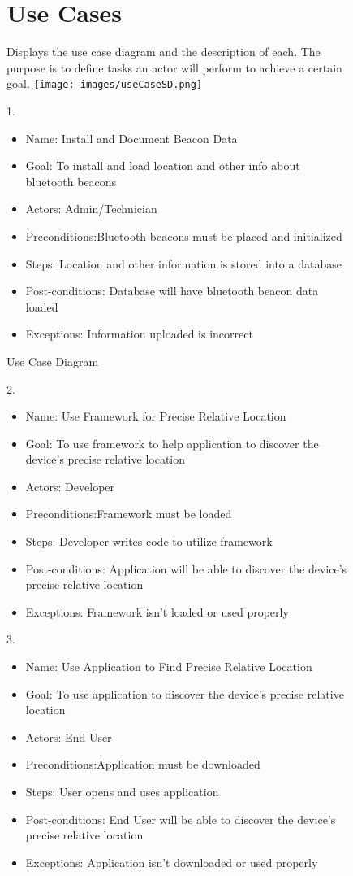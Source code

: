 \begin{figure}
\chapter{Use Cases}
Displays the use case diagram and the description of each. The purpose is to define tasks an actor will perform to achieve a certain goal.
\newline
\texttt{[image: images/useCaseSD.png]}
\caption{Use Case Diagram}

1.
\begin{itemize}
\item Name: Install and Document Beacon Data
\item Goal: To install and load location and other info about bluetooth beacons
\item Actors: Admin/Technician
\item Preconditions:Bluetooth beacons must be placed and initialized
\item Steps: Location and other information is stored into a database
\item Post-conditions: Database will have bluetooth beacon data loaded
\item Exceptions: Information uploaded is incorrect
\end{itemize}
\end{figure}
\begin{figure}
2.
\begin{itemize}
\item Name: Use Framework for Precise Relative Location
\item Goal: To use framework to help application to discover the device's precise relative location
\item Actors: Developer
\item Preconditions:Framework must be loaded
\item Steps: Developer writes code to utilize framework
\item Post-conditions: Application will be able to discover the device's precise relative location
\item Exceptions: Framework isn't loaded or used properly
\end{itemize}
3.
\begin{itemize}
\item Name: Use Application to Find Precise Relative Location
\item Goal: To use application to discover the device's precise relative location
\item Actors: End User
\item Preconditions:Application must be downloaded
\item Steps: User opens and uses application
\item Post-conditions: End User will be able to discover the device's precise relative location
\item Exceptions: Application isn't downloaded or used properly
\end{itemize}
\end{figure}
